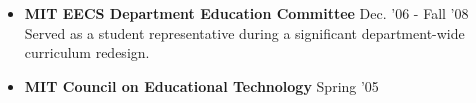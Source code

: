 \documentclass[margin]{res}
\begin{document}
\begin{resume}
\begin{itemize}[leftmargin=*]
\item {\bf MIT EECS Department Education Committee} \hfill Dec. '06 - Fall '08 \\
Served as a student representative during a significant department-wide curriculum redesign.
\item {\bf MIT Council on Educational Technology} \hfill Spring '05 


 \end{itemize}
		 


          

		
		 


 
 
 


 
%		 
		
 
		

		 


\end{resume}
\end{document}
